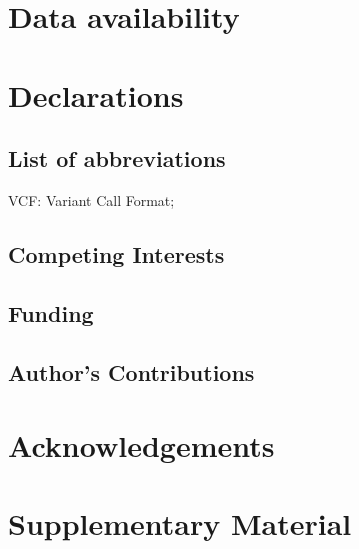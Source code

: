 \documentclass[a4paper,num-refs]{oup-contemporary}
\begin{document}
\section{Data availability}

\section{Declarations}

\subsection{List of abbreviations}

VCF: Variant Call Format;

\subsection{Competing Interests}

\subsection{Funding}

\subsection{Author's Contributions}

\section{Acknowledgements}




\clearpage
\renewcommand\thefigure{S\arabic{figure}}
\setcounter{figure}{0}
\renewcommand\thetable{S\arabic{table}}
\setcounter{table}{0}

\section*{Supplementary Material}
\end{document}
